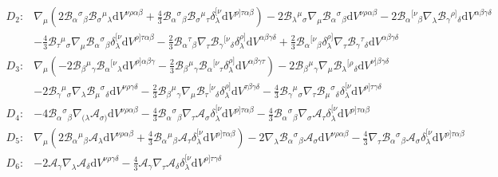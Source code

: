 \documentclass{article}
\providecommand{\B}[3]{\mathcal{B}_{#1}{}^{ #2}{}_{#3}}
\providecommand{\A}[1]{\mathcal{A}_{#1}}
\providecommand{\deV}[1]{\mathrm{d}V^{#1}}
\begin{document}
\begin{align*}
    D_2: & \nabla_{\mu} \left( 2\B{\alpha}{\sigma}{\beta} \B{\sigma}{\mu}{\lambda} \deV{\nu\rho\alpha\beta} +\frac{4}{3} \B{\alpha}{\sigma}{\beta} \B{\sigma}{\mu}{\tau} \delta^{[\nu}_{\lambda} \deV{\rho]\tau\alpha\beta} \right) - 2\B{\lambda}{\mu}{\sigma}\nabla_{\mu}\B{\alpha}{\sigma}{\beta} \deV{\nu\rho\alpha\beta} - 2\B{\alpha}{[\nu}{\beta} \nabla_{\lambda} \B{\gamma}{\rho]}{\delta} \deV{\alpha\beta\gamma\delta}\\
        & - \frac{4}{3} \B{\tau}{\mu}{\sigma} \nabla_{\mu} \B{\alpha}{\sigma}{\beta} \delta^{[\nu}_{\lambda} \deV{\rho]\tau\alpha\beta} - \frac{2}{3}\B{\alpha}{\tau}{\beta} \nabla_{\tau} \B{\gamma}{[\nu}{\delta} \delta^{\rho]}_{\lambda} \deV{\alpha\beta\gamma\delta} + \frac{2}{3} \B{\alpha}{[\nu}{\beta} \delta^{\rho]}_{\lambda} \nabla_{\tau} \B{\gamma}{\tau}{\delta}\deV{\alpha\beta\gamma\delta}\\
    D_3: &  \nabla_{\mu} \left( -2 \B{\beta}{\mu}{\gamma} \B{\alpha}{[\nu}{\lambda} \deV{\rho]\alpha\beta\gamma} -\frac{2}{3} \B{\beta}{\mu}{\gamma} \B{\alpha}{[\nu}{\tau} \delta^{\rho]}_{\lambda}\deV{\alpha\beta\gamma\tau} \right) - 2\B{\beta}{\mu}{\gamma}\nabla_{\mu}\B{\lambda}{[\rho}{\delta}\deV{\nu]\beta\gamma\delta} \\
        &  -2 \B{\gamma}{\mu}{\sigma} \nabla_{\lambda} \B{\mu}{\sigma}{\delta}\deV{\nu\rho\gamma\delta} - \frac{2}{3}\B{\beta}{\mu}{\gamma} \nabla_{\mu} \B{\tau}{[\nu}{\delta} \delta^{\rho]}_{\lambda} \deV{\tau\beta\gamma\delta} - \frac{4}{3} \B{\gamma}{\mu}{\sigma} \nabla_{\tau} \B{\mu}{\sigma}{\delta} \delta^{[\nu}_{\lambda} \deV{\rho]\tau\gamma\delta}\\
    D_4: & -4\B{\alpha}{\sigma}{\beta} \nabla_{(\lambda} \A{\sigma)} \deV{\nu\rho\alpha\beta} - \frac{4}{3} \B{\alpha}{\sigma}{\beta}\nabla_{\tau}\A{\sigma} \delta^{[\nu}_{\lambda} \deV{\rho]\tau\alpha\beta} - \frac{4}{3}\B{\alpha}{\sigma}{\beta} \nabla_{\sigma}\A{\tau} \delta^{[\nu}_{\lambda}\deV{\rho]\tau\alpha\beta}\\
    D_5: & \nabla_{\mu} \left( 2\B{\alpha}{\mu}{\beta} \A{\lambda} \deV{\nu\rho\alpha\beta} + \frac{4}{3}\B{\alpha}{\mu}{\beta} \A{\tau} \delta^{[\nu}_{\lambda} \deV{\rho]\tau\alpha\beta} \right) - 2 \nabla_{\lambda} \B{\alpha}{\sigma}{\beta}\A{\sigma}\deV{\nu\rho\alpha\beta} - \frac{4}{3}\nabla_{\tau} \B{\alpha}{\sigma}{\beta} \A{\sigma} \delta^{[\nu}_{\lambda}\deV{\rho]\tau\alpha\beta}\\
    D_6: & -2\A{\gamma}\nabla_\lambda \A{\delta}\deV{\nu\rho\gamma\delta} - \frac{4}{3}\A{\gamma}\nabla_\tau\A{\delta}\delta^{[\nu}_{\lambda}\deV{\rho]\tau\gamma\delta} \\

\end{align*}
\end{document}
